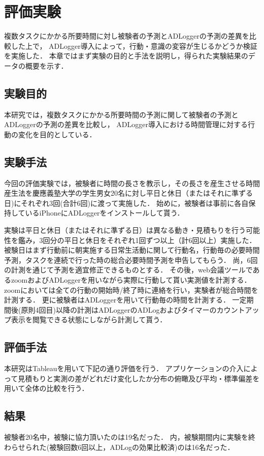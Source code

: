 \documentclass[submit,techrep,noauthor]{ipsj}
\begin{document}
\section{評価実験}
複数タスクにかかる所要時間に対し被験者の予測とADLoggerの予測の差異を比較した上で，
ADLogger導入によって，行動・意識の変容が生じるかどうか検証を実施した．
本章ではまず実験の目的と手法を説明し，得られた実験結果のデータの概要を示す．

\subsection{実験目的}
本研究では，複数タスクにかかる所要時間の予測に関して被験者の予測とADLoggerの予測の差異を比較し，
ADLogger導入における時間管理に対する行動の変化を目的としている．

\subsection{実験手法}
今回の評価実験では，被験者に時間の長さを教示し，その長さを産生させる時間産生法\cite{Oguro1961}を慶應義塾大学の学生男女20名に対し平日と休日（またはそれに準ずる日)にそれぞれ3回(合計6回)に渡って実施した．
始めに，被験者は事前に各自保持しているiPhoneにADLoggerをインストールして貰う．

実験は平日と休日（またはそれに準ずる日）は異なる動き・見積もりを行う可能性を鑑み，3回分の平日と休日をそれぞれ1回ずつ以上（計6回以上）実施した．
被験日はまず行動前に朝実施する日常生活動に関して行動名，行動毎の必要時間予測，タスクを連続で行った時の総合必要時間予測を申告してもらう．
尚，6回の計測を通じて予測を適宜修正できるものとする．
その後，web会議ツールであるzoomおよびADLoggerを用いながら実際に行動して貰い実測値を計測する．
zoomにおいては全ての行動の開始時/終了時に連絡を行い，実験者が総合時間を計測する．
更に被験者はADLoggerを用いて行動毎の時間を計測する．
一定期間後(原則4回目)以降の計測はADLoggerのADLogおよびタイマーのカウントアップ表示を閲覧できる状態にしながら計測して貰う．

\subsection{評価手法}
本研究はTableauを用いて下記の通り評価を行う．
アプリケーションの介入によって見積もりと実測の差がどれだけ変化したか分布の俯瞰及び平均・標準偏差を用いて全体の比較を行う．

\subsection{結果}
被験者20名中，被験に協力頂いたのは19名だった．
内，被験期間内に実験を終わらせられた(被験回数6回以上，ADLogの効果比較済)のは16名だった．
\end{document}
